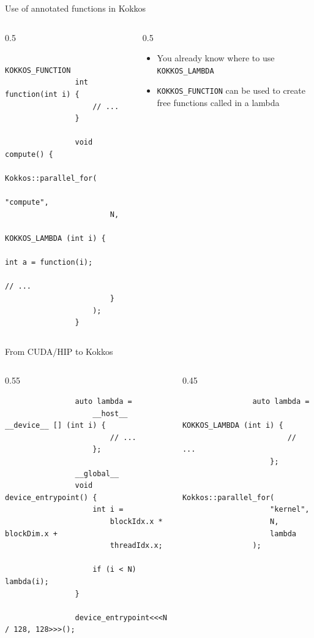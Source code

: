 \documentclass[
    aspectratio=169,
]{beamer}
\begin{document}
\begin{frame}[fragile]{Use of annotated functions in Kokkos}
    \begin{columns}
        \begin{column}{0.5\linewidth}
            \begin{verbatim}
                KOKKOS_FUNCTION
                int function(int i) {
                    // ...
                }

                void compute() {
                    Kokkos::parallel_for(
                        "compute",
                        N,
                        KOKKOS_LAMBDA (int i) {
                            int a = function(i);
                            // ...
                        }
                    );
                }
            \end{verbatim}
        \end{column}
        \begin{column}{0.5\linewidth}
            \begin{itemize}
                \item You already know where to use \texttt{KOKKOS\_LAMBDA}
                \pause
                \item \texttt{KOKKOS\_FUNCTION} can be used to create free functions called in a lambda
            \end{itemize}
        \end{column}
    \end{columns}
\end{frame}

\begin{frame}[fragile]{From CUDA/HIP to Kokkos}
    \begin{columns}
        \begin{column}{0.55\linewidth}
            \begin{verbatim}
                auto lambda =
                    __host__ __device__ [] (int i) {
                        // ...
                    };

                __global__
                void device_entrypoint() {
                    int i =
                        blockIdx.x * blockDim.x +
                        threadIdx.x;

                    if (i < N) lambda(i);
                }

                device_entrypoint<<<N / 128, 128>>>();
            \end{verbatim}
        \end{column}
        \begin{column}{0.45\linewidth}
            \begin{verbatim}
                auto lambda =
                    KOKKOS_LAMBDA (int i) {
                        // ...
                    };

                Kokkos::parallel_for(
                    "kernel",
                    N,
                    lambda
                );
            \end{verbatim}
        \end{column}
    \end{columns}
\end{frame}
\end{document}
